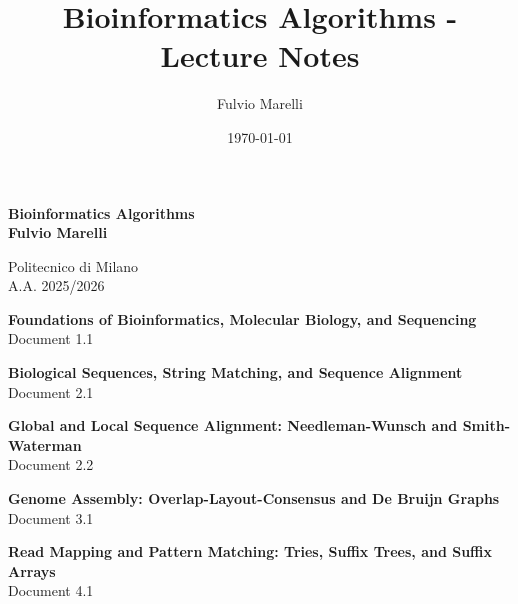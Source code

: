 \documentclass[a4paper,11pt]{article}
\title{Bioinformatics Algorithms - Lecture Notes}
\author{Fulvio Marelli}
\date{\today}
\newcounter{docnum}
\begin{document}
\begin{titlepage}
    \centering
    \vspace*{\fill}
    \doublespacing
    {\Huge \textbf{Bioinformatics Algorithms}}\\[0.5cm]
    {\Large \textbf{Fulvio Marelli}}\\
    \vspace*{2cm}

    {\large Politecnico di Milano \\ A.A. 2025/2026} \\
    \vspace*{\fill}
\end{titlepage}

\newpage
\tableofcontents
\newpage

\setcounter{section}{0}
\begin{center}\Huge\textbf{Foundations of Bioinformatics, Molecular Biology, and Sequencing}\\[0.2cm]\Large Document 1.1\end{center}\vspace{2cm}

\newpage
{}
\setcounter{section}{0}
\begin{center}\Huge\textbf{Biological Sequences, String Matching, and Sequence Alignment}\\[0.2cm]\Large Document 2.1\end{center}\vspace{2cm}

\newpage
{}
\setcounter{section}{0}
\begin{center}\Huge\textbf{Global and Local Sequence Alignment: Needleman-Wunsch and Smith-Waterman}\\[0.2cm]\Large Document 2.2\end{center}\vspace{2cm}

\newpage
{}
\setcounter{section}{0}
\begin{center}\Huge\textbf{Genome Assembly: Overlap-Layout-Consensus and De Bruijn Graphs}\\[0.2cm]\Large Document 3.1\end{center}\vspace{2cm}

\newpage
{}
\setcounter{section}{0}
\begin{center}\Huge\textbf{Read Mapping and Pattern Matching: Tries, Suffix Trees, and Suffix Arrays}\\[0.2cm]\Large Document 4.1\end{center}\vspace{2cm}
\end{document}
